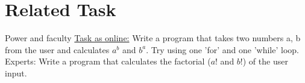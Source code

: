 \section{Related Task}
\begin{frame}{Power and faculty}
    \href{http://fsr.github.io/c-lessons/exercises/08_power_and_faculty.html}{Task as online:} \newline
    Write a program that takes two numbers a, b from the user and calculates \begin{math}{a^b}\end{math}
    and \begin{math}{b^a}\end{math}. Try using one 'for' and one 'while' loop. 
    \newline 
    \newline
    Experts: Write a program that calculates the factorial (\begin{math}{a!}\end{math} and \begin{math}{b!}\end{math}) of the user input.
\end{frame}





